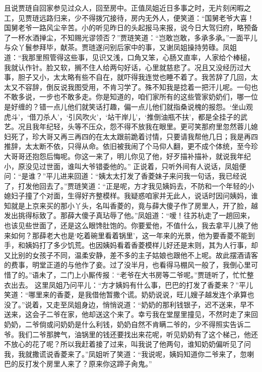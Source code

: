 \documentclass[12pt,oneside]{book}
\begin{document}
且说贾琏自回家参见过众人，回至房中。正值凤姐近日多事之时，无片刻闲暇之工，见贾琏远路归来，少不得拨冗接待，房内无外人，便笑道：“国舅老爷大喜！国舅老爷一路风尘辛苦。小的听见昨日的头起报马来报，说今日大驾归府，略预备了一杯水酒掸尘，不知赐光谬领否？”贾琏笑道：“岂敢岂敢，多承多承。”一面平儿与众丫鬟参拜毕，献茶。贾琏遂问别后家中的事，又谢凤姐操持劳碌。凤姐道：“我那里照管得这些事，见识又浅，口角又笨，心肠又直率，人家给个棒槌，我就认作针。脸又软，搁不住人给两句好话，心里就慈悲了。况且又没经历过大事，胆子又小，太太略有些不自在，就吓得我连觉也睡不着了。我苦辞了几回，太太又不容辞，倒反说我图受用，不肯习学了。殊不知我是捻着一把汗儿呢。一句也不敢多说，一步也不敢多走。你是知道的，咱们家所有的这些管家奶奶们，哪一位是好缠的？错一点儿他们就笑话打趣，偏一点儿他们就指桑说槐的报怨。‘坐山观虎斗’，‘借刀杀人’，‘引风吹火’，‘站干岸儿’，‘推倒油瓶不扶’，都是全挂子的武艺。况且我年纪轻，头等不压众，怨不得不放我在眼里。更可笑那府里忽然蓉儿媳妇死了，珍大哥又再三再四的在太太跟前跪着讨情，只要请我帮他几日；我是再四推辞，太太断不依，只得从命。依旧被我闹了个马仰人翻，更不成个体统，至今珍大哥哥还抱怨后悔呢。你这一来了，明儿你见了他，好歹描补描补，就说我年纪小，原没见过世面，谁叫大爷错委他的。”
正说着，只听外间有人说话，凤姐便问：“是谁？”平儿进来回道：“姨太太打发了香菱妹子来问我一句话，我已经说了，打发他回去了。”贾琏笑道：“正是呢，方才我见姨妈去，不防和一个年轻的小媳妇子撞了个对面，生得好齐整模样。我疑惑咱家并无此人，说话时因问姨妈，谁知就是上京来买的那小丫头，名叫香菱的，竟与薛大傻子作了房里人，开了脸，越发出挑得标致了。那薛大傻子真玷辱了他。”凤姐道：“嗳！往苏杭走了一趟回来，也该见些世面了，还是这么眼馋肚饱的。你要爱他，不值什么，我去拿平儿换了他来如何？那薛老大也是‘吃着碗里看着锅里’，这一年来的光景，他为要香菱不能到手，和姨妈打了多少饥荒。也因姨妈看着香菱模样儿好还是末则，其为人行事，却又比别的女孩子不同，温柔安静，差不多的主子姑娘也跟他不上呢。故此摆酒请客的费事，明堂正道的与他作了妾。过了没半月，也看得马棚风一般了，我倒心里可惜了的。”语未了，二门上小厮传报︰“老爷在大书房等二爷呢。”贾琏听了，忙忙整衣出去。
这里凤姐乃问平儿：“方才姨妈有什么事，巴巴的打发了香菱来？”平儿笑道：“哪里来的香菱，是我借他暂撒个谎。奶奶说说，旺儿嫂子越发连个承算也没了。”说着，又走至凤姐身边，悄悄说道：“奶奶的那利钱银子，迟不送来，早不送来，这会子二爷在家，他却送这个来了。幸亏我在堂屋里撞见，不然时走了来回奶奶，二爷倘或问奶奶是什么利钱，奶奶自然不肯瞒二爷的，少不得照实告诉二爷。我们二爷那脾气，油锅里的钱还要找出来花呢，听见奶奶有了这个梯己，他还不放心的花了呢？所以我赶着接了过来，叫我说了他两句，谁知奶奶偏听见了问我，我就撒谎说香菱来了。”凤姐听了笑道：“我说呢，姨妈知道你二爷来了，忽喇巴的反打发个房里人来了？原来你这蹄子肏鬼。”
\end{document}
